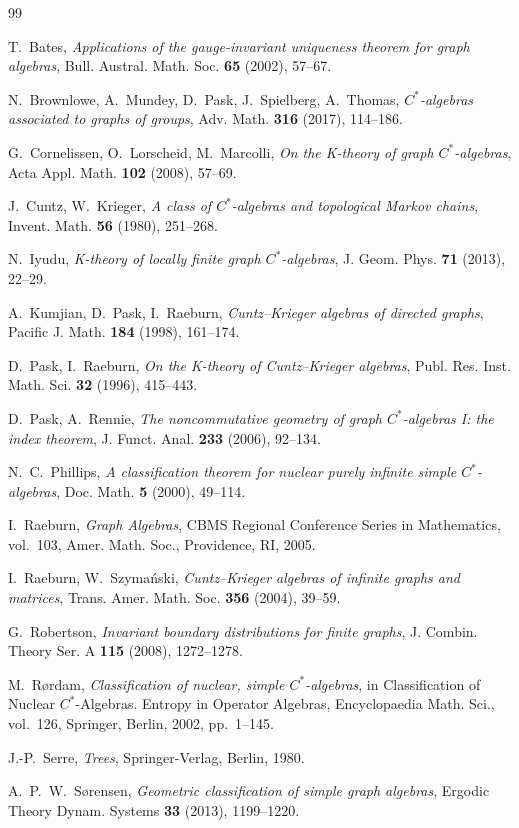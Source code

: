 \documentclass[12pt,reqno]{amsart}
\theoremstyle{plain}
\theoremstyle{definition}
\begin{document}
\begin{thebibliography}{99}

 T.~Bates, \emph{Applications of the gauge-invariant uniqueness theorem for graph algebras}, Bull. Austral. Math. Soc. \textbf{65} (2002), 57--67.

 N.~Brownlowe, A.~Mundey, D.~Pask, J.~Spielberg, A.~Thomas, \emph{$C^*$-algebras
associated to graphs of groups}, Adv. Math. \textbf{316} (2017), 114--186.

 G.~Cornelissen, O.~Lorscheid, M.~Marcolli, \emph{On the K-theory of graph
$C^*$-algebras}, Acta Appl. Math. \textbf{102} (2008), 57--69.

 J.~Cuntz, W.~Krieger, \emph{A class of $C^*$-algebras and topological Markov chains},
Invent. Math. \textbf{56} (1980), 251--268.

 N.~Iyudu, \emph{K-theory of locally finite graph $C^*$-algebras}, J. Geom. Phys.
\textbf{71} (2013), 22--29.

 A.~Kumjian, D.~Pask, I.~Raeburn, \emph{Cuntz--Krieger algebras of directed graphs},
Pacific J. Math. \textbf{184} (1998), 161--174.

 D.~Pask, I.~Raeburn, \emph{On the K-theory of Cuntz--Krieger algebras}, Publ. Res.
Inst. Math. Sci. \textbf{32} (1996), 415--443.

 D.~Pask, A.~Rennie, \emph{The noncommutative geometry of graph $C^*$-algebras I:
the index theorem}, J. Funct. Anal. \textbf{233} (2006), 92--134.

 N.~C.~Phillips, \emph{A classification theorem for nuclear purely infinite
simple $C^*$-algebras}, Doc. Math. \textbf{5} (2000), 49--114.

 I.~Raeburn, \emph{Graph Algebras}, CBMS Regional Conference Series in Mathematics,
vol.~103, Amer. Math. Soc., Providence, RI, 2005.

 I.~Raeburn, W.~Szyma\'nski, \emph{Cuntz--Krieger algebras of infinite graphs and
matrices}, Trans. Amer. Math. Soc. \textbf{356} (2004), 39--59.

 G.~Robertson, \emph{Invariant boundary distributions for finite graphs},
J. Combin. Theory Ser. A \textbf{115} (2008), 1272--1278.

 M.~R\o rdam, \emph{Classification of nuclear, simple $C^*$-algebras}, in
Classification of Nuclear $C^*$-Algebras. Entropy in Operator Algebras, Encyclopaedia Math. Sci.,
vol.~126, Springer, Berlin, 2002, pp.~1--145.

 J.-P.~Serre, \emph{Trees}, Springer-Verlag, Berlin, 1980.

 A.~P.~W.~S\o rensen, \emph{Geometric classification of simple graph algebras},
Ergodic Theory Dynam. Systems \textbf{33} (2013), 1199--1220.

\end{thebibliography}
\end{document}

